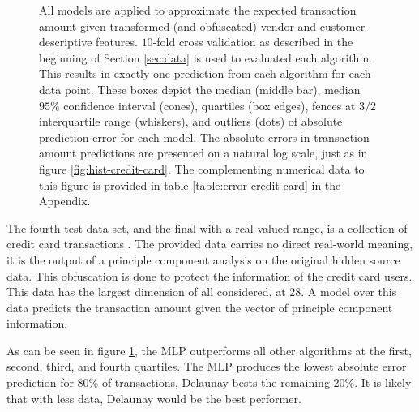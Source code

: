 \documentclass[smallextended,final]{svjour3}       %
\begin{document}
\begin{figure}
  \centering
  \caption{All models are applied to approximate the expected
    transaction amount given transformed (and obfuscated) vendor and
    customer-descriptive features. $10$-fold cross validation as
    described in the beginning of Section \ref{sec:data} is used to
    evaluated each algorithm. This results in exactly one prediction
    from each algorithm for each data point. These boxes depict the
    median (middle bar), median $95\%$ confidence interval (cones),
    quartiles (box edges), fences at $3/2$ interquartile range
    (whiskers), and outliers (dots) of absolute prediction error for
    each model. The absolute errors in transaction amount predictions
    are presented on a natural log scale, just as in figure
    \ref{fig:hist-credit-card}. The complementing numerical data to
    this figure is provided in table \ref{table:error-credit-card} in
    the Appendix.}
  \label{fig:error-credit-card}
\end{figure}

The fourth test data set, and the final with a real-valued range, is a
collection of credit card transactions
\cite{pozzolo2015calibrating}. The provided data carries no direct
real-world meaning, it is the output of a principle component analysis
on the original hidden source data. This obfuscation is done to
protect the information of the credit card users. This data has the
largest dimension of all considered, at 28. A model over this data
predicts the transaction amount given the vector of principle
component information.

As can be seen in figure \ref{fig:error-credit-card}, the MLP
outperforms all other algorithms at the first, second, third, and
fourth quartiles. The MLP produces the lowest absolute error
prediction for 80\% of transactions, Delaunay bests the remaining
20\%. It is likely that with less data, Delaunay would be the best
performer.
\end{document}

